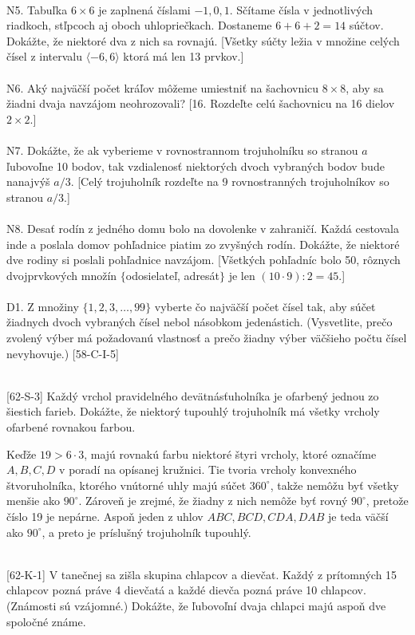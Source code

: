 \\
N5. Tabuľka $6 \times 6$ je zaplnená číslami $-1, 0, 1$. Sčítame čísla v jednotlivých riadkoch, stľpcoch aj oboch uhlopriečkach. Dostaneme $6+6+2 = 14$ súčtov. Dokážte, že niektoré dva z nich sa rovnajú. [Všetky súčty ležia v množine celých čísel z intervalu $\langle -6, 6 \rangle$ ktorá má len 13 prvkov.]\\
\\
N6. Aký najväčší počet kráľov môžeme umiestniť na šachovnicu $8\times 8$, aby sa žiadni dvaja navzájom neohrozovali? [16. Rozdeľte celú šachovnicu na 16 dielov $2\times 2$.]\\
\\
N7. Dokážte, že ak vyberieme v rovnostrannom trojuholníku so stranou $a$ ľubovoľne 10 bodov, tak vzdialenosť niektorých dvoch vybraných bodov bude nanajvýš $a/3$. [Celý trojuholník rozdeľte na 9 rovnostranných trojuholníkov so stranou $a/3$.]\\
\\
N8. Desať rodín z jedného domu bolo na dovolenke v zahraničí. Každá cestovala inde a poslala domov pohľadnice piatim zo zvyšných rodín. Dokážte, že niektoré dve rodiny si poslali pohľadnice navzájom. [Všetkých pohľadníc bolo 50, rôznych dvojprvkových množín $\{$odosielateľ, adresát$\}$ je len $(10\cdot9) : 2 = 45$.]\\
\\
D1. Z množiny $\{1, 2, 3, \ldots , 99\}$ vyberte čo najväčší počet čísel tak, aby súčet žiadnych dvoch vybraných čísel nebol násobkom jedenástich. (Vysvetlite, prečo zvolený výber má požadovanú vlastnosť a prečo žiadny výber väčšieho počtu čísel nevyhovuje.)
[58-C-I-5]\\
\\
\begin{tcolorbox}[breakable,notitle,boxrule=0pt,colback=light-gray,colframe=light-gray]\ul [62-S-3]
Každý vrchol pravidelného devätnásťuholníka je ofarbený jednou zo šiestich farieb. Dokážte, že niektorý tupouhlý trojuholník má všetky vrcholy ofarbené rovnakou farbou.

\end{tcolorbox}

\rieh Keďže $19 > 6 \cdot 3$, majú rovnakú farbu niektoré štyri vrcholy, ktoré označíme $A, B, C, D$ v poradí na opísanej kružnici. Tie tvoria vrcholy konvexného štvoruholníka, ktorého vnútorné uhly majú súčet $360^{\circ}$, takže nemôžu byť všetky menšie ako $90^{\circ}$. Zároveň je zrejmé, že žiadny z nich nemôže byť rovný $90^{\circ}$, pretože číslo 19 je nepárne. Aspoň jeden z uhlov $ABC, BCD, CDA, DAB$ je teda väčší ako $90^{\circ}$, a preto je príslušný trojuholník tupouhlý.\\
\\
\begin{tcolorbox}[breakable,notitle,boxrule=0pt,colback=light-gray,colframe=light-gray]\ul [62-K-1]
V tanečnej sa zišla skupina chlapcov a dievčat. Každý z prítomných 15 chlapcov pozná práve 4 dievčatá a každé dievča pozná práve 10 chlapcov. (Známosti sú vzájomné.) Dokážte, že ľubovoľní dvaja chlapci majú aspoň dve spoločné známe.

\end{tcolorbox}

